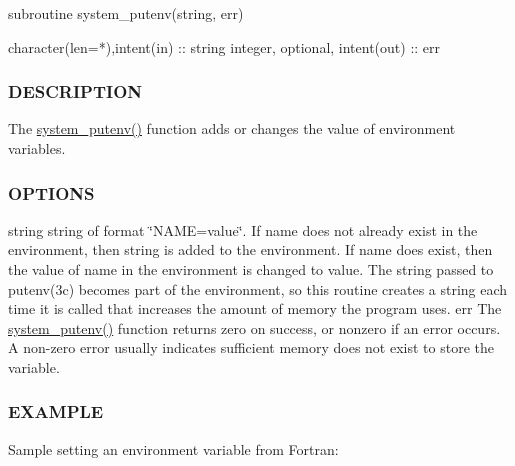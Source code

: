 \begin{DoxyVerb}subroutine system_putenv(string, err)

 character(len=*),intent(in)    :: string
 integer, optional, intent(out) :: err
\end{DoxyVerb}


\subsubsection*{D\+E\+S\+C\+R\+I\+P\+T\+I\+ON}

The \mbox{\hyperlink{namespacem__system_af0c9df8e59cac9cd617cd1e20448ea7d}{system\+\_\+putenv()}} function adds or changes the value of environment variables.

\subsubsection*{O\+P\+T\+I\+O\+NS}

string string of format \char`\"{}\+N\+A\+M\+E=value\char`\"{}. If name does not already exist in the environment, then string is added to the environment. If name does exist, then the value of name in the environment is changed to value. The string passed to putenv(3c) becomes part of the environment, so this routine creates a string each time it is called that increases the amount of memory the program uses. err The \mbox{\hyperlink{namespacem__system_af0c9df8e59cac9cd617cd1e20448ea7d}{system\+\_\+putenv()}} function returns zero on success, or nonzero if an error occurs. A non-\/zero error usually indicates sufficient memory does not exist to store the variable.

\subsubsection*{E\+X\+A\+M\+P\+LE}

Sample setting an environment variable from Fortran\+:

